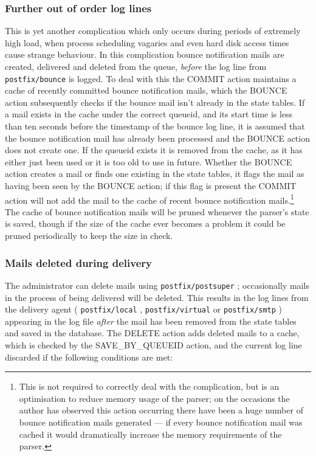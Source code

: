 \documentclass[a4paper,12pt,draft]{article}
\newcommand{\daemon}[1]{%
    \texttt{postfix/#1}%
}
\begin{document}
\subsubsection{Further out of order log lines}

\label{Further out of order log lines}

This is yet another complication which only occurs during periods of
extremely high load, when process scheduling vagaries and even hard disk
access times cause strange behaviour.  In this complication bounce
notification mails are created, delivered and deleted from the queue,
\textit{before\/} the log line from \daemon{bounce} is logged.  To deal
with this the COMMIT action maintains a cache of recently committed bounce
notification mails, which the BOUNCE action subsequently checks if the
bounce mail isn't already in the state tables. If a mail exists in the
cache under the correct queueid, and its start time is less than ten
seconds before the timestamp of the bounce log line, it is assumed that the
bounce notification mail has already been processed and the BOUNCE action
does not create one.  If the queueid exists it is removed from the cache,
as it has either just been used or it is too old to use in future.  Whether
the BOUNCE action creates a mail or finds one existing in the state tables,
it flags the mail as having been seen by the BOUNCE action; if this flag is
present the COMMIT action will not add the mail to the cache of recent
bounce notification mails.\footnote{This is not required to correctly deal
with the complication, but is an optimisation to reduce memory usage of the
parser; on the occasions the author has observed this action occurring
there have been a huge number of bounce notification mails generated --- if
every bounce notification mail was cached it would dramatically increase
the memory requirements of the parser.}  The cache of bounce notification
mails will be pruned whenever the parser's state is saved, though if the
size of the cache ever becomes a problem it could be pruned periodically to
keep the size in check.

\subsubsection{Mails deleted during delivery}

\label{Mails deleted during delivery}

The administrator can delete mails using \daemon{postsuper}; occasionally
mails in the process of being delivered will be deleted.  This results in
the log lines from the delivery agent (\daemon{local}, \daemon{virtual} or
\daemon{smtp}) appearing in the log file \textit{after\/} the mail has been
removed from the state tables and saved in the database.  The DELETE action
adds deleted mails to a cache, which is checked by the SAVE\_BY\_QUEUEID
action, and the current log line discarded if the following conditions are
met:
\end{document}
